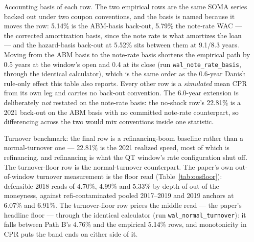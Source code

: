 \documentclass[12pt]{article}
\begin{document}
\begin{table}[H]
\begin{threeparttable}
\begin{tablenotes}[flushleft]
\item Accounting basis of each row. The two empirical rows are the same SOMA series backed out under two coupon conventions, and the basis is named because it moves the row: 5.14\% is the ABM-basis back-out, 5.79\% the note-rate WAC --- the corrected amortization basis, since the note rate is what amortizes the loan --- and the hazard-basis back-out at 5.52\% sits between them at 9.1/8.3 years. Moving from the ABM basis to the note-rate basis shortens the empirical path by 0.5 years at the window's open and 0.4 at its close (run \texttt{wal\_note\_rate\_basis}, through the identical calculator), which is the same order as the 0.6-year Danish rule-only effect this table also reports. Every other row is a \emph{simulated} mean CPR from its own leg and carries no back-out convention. The 6.0-year extension is deliberately \emph{not} restated on the note-rate basis: the no-shock row's 22.81\% is a 2021 back-out on the ABM basis with no committed note-rate counterpart, so differencing across the two would mix conventions inside one statistic.
\item Turnover benchmark: the final row is a refinancing-boom baseline rather than a normal-turnover one --- 22.81\% is the 2021 realized speed, most of which is refinancing, and refinancing is what the QT window's rate configuration shut off. The turnover-floor row is the normal-turnover counterpart. The paper's own out-of-window turnover measurement is the floor read (Table~\ref{tab:oosfloor}): defensible 2018 reads of 4.70\%, 4.99\% and 5.33\% by depth of out-of-the-moneyness, against refi-contaminated pooled 2017--2019 and 2019 anchors at 6.07\% and 6.91\%. The turnover-floor row prices the middle read --- the paper's headline floor --- through the identical calculator (run \texttt{wal\_normal\_turnover}): it falls between Path B's 4.76\% and the empirical 5.14\% rows, and monotonicity in CPR puts the band ends on either side of it.
\end{tablenotes}
\end{threeparttable}
\end{table}
\end{document}
